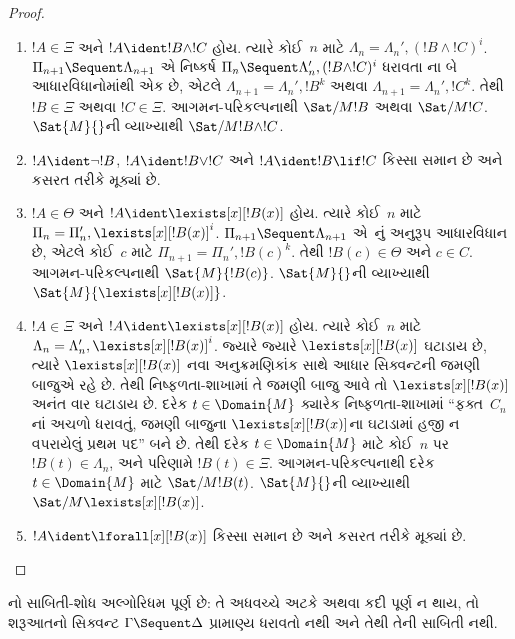 \begin{proof}
\begin{enumerate}
  \item $!A \in \Xi$
  અને
  $!A \ident !B \land !C$
  હોય. ત્યારે
  કોઈ~$n$ માટે
  $\Lambda_n = \Lambda_n', (!B \land !C)^i$.
  $\Pi_{n+1} \Sequent
  \Lambda_{n+1}$
  એ નિષ્કર્ષ
  $\Pi_n \Sequent \Lambda'_n, (!B \land !C)^i$
  ધરાવતા
  \RightR{\land}ના
  બે આધારવિધાનોમાંથી
  એક છે, એટલે
  $\Lambda_{n+1} = \Lambda_n', !B^k$
  અથવા
  $\Lambda_{n+1} = \Lambda_n',
  !C^k$.
  તેથી
  $!B \in \Xi$
  અથવા
  $!C \in \Xi$.
  આગમન-પરિકલ્પનાથી
  $\Sat/{M}{!B}$
  અથવા
  $\Sat/{M}{!C}$.
  $\Sat{M}{}$ની
  વ્યાખ્યાથી
  $\Sat/{M}{!B \land !C}$.
  
  
  \item
  $!A \ident \lnot !B$,
  $!A \ident !B \lor !C$
  અને
  $!A \ident !B \lif !C$
  કિસ્સા સમાન
  છે અને
  કસરત તરીકે
  મૂક્યાં છે.

  \item $!A \in \Theta$
  અને
  $!A \ident \lexists[x][!B(x)]$
  હોય. ત્યારે
  કોઈ~$n$ માટે
  $\Pi_n = \Pi_n', \lexists[x][!B(x)]^i$.
  $\Pi_{n+1}
  \Sequent \Lambda_{n+1}$
  એ~\LeftR{\lexists}નું
  અનુરૂપ
  આધારવિધાન
  છે, એટલે
  કોઈ~$c$ માટે
  $\Pi_{n+1} = \Pi_n', !B(c)^k$.
  તેથી
  $!B(c) \in \Theta$
  અને
  $c \in C$.
  આગમન-પરિકલ્પનાથી
  $\Sat{M}{!B(c)}$.
  $\Sat{M}{}$ની
  વ્યાખ્યાથી
  $\Sat{M}{\lexists[x][!B(x)]}$.

  \item $!A \in \Xi$
  અને
  $!A \ident \lexists[x][!B(x)]$
  હોય. ત્યારે
  કોઈ~$n$ માટે
  $\Lambda_n = \Lambda_n', \lexists[x][!B(x)]^i$.
  જ્યારે જ્યારે
  $\lexists[x][!B(x)]$
  ઘટાડાય છે,
  ત્યારે
  $\lexists[x][!B(x)]$
  નવા અનુક્રમણિકાંક
  સાથે આધાર
  સિક્વન્ટની
  જમણી બાજુએ
  રહે છે.
  તેથી નિષ્ફળતા-શાખામાં
  તે જમણી બાજુ
  આવે તો
  $\lexists[x][!B(x)]$
  અનંત વાર
  ઘટાડાય છે.
  દરેક
  $t \in
  \Domain{M}$
  ક્યારેક
  નિષ્ફળતા-શાખામાં
  ``ફક્ત~$C_n$નાં
  અચળો ધરાવતું,
  જમણી બાજુના
  $\lexists[x][!B(x)]$ના
  ઘટાડામાં હજી
  ન વપરાયેલું
  પ્રથમ પદ''
  બને છે.
  તેથી દરેક
  $t \in \Domain{M}$
  માટે કોઈ~$n$
  પર
  $!B(t) \in \Lambda_n$,
  અને પરિણામે
  $!B(t) \in \Xi$.
  આગમન-પરિકલ્પનાથી
  દરેક
  $t \in
  \Domain{M}$
  માટે
  $\Sat/{M}{!B(t)}$.
  $\Sat{M}{}$ની
  વ્યાખ્યાથી
  $\Sat/{M}{\lexists[x][!B(x)]}$.

  \item
  $!A \ident \lforall[x][!B(x)]$
  કિસ્સા સમાન
  છે અને
  કસરત તરીકે
  મૂક્યાં છે.
\end{enumerate}
\end{proof}

\begin{cor}
નો
સાબિતી-શોધ
અલ્ગોરિધમ પૂર્ણ
છે: તે અધવચ્ચે
અટકે અથવા
કદી પૂર્ણ ન
થાય, તો શરૂઆતનો
સિક્વન્ટ
$\Gamma \Sequent \Delta$
પ્રામાણ્ય ધરાવતો નથી
અને તેથી
તેની સાબિતી
નથી.
\end{cor}

